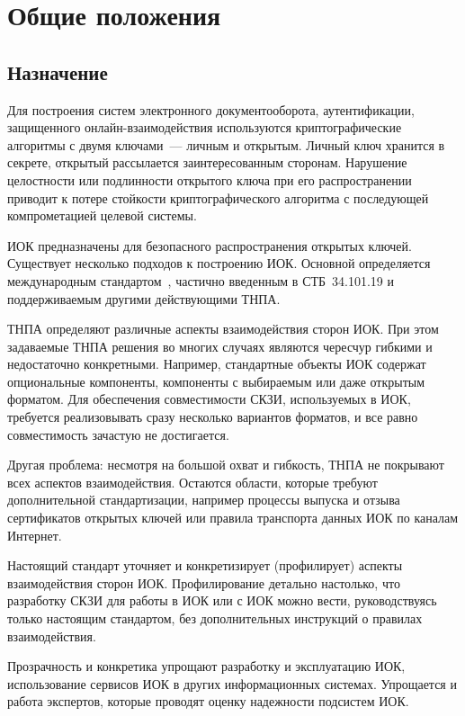\chapter{Общие положения}\label{COMMON}

\section{Назначение}

Для построения систем электронного документооборота, аутентификации, защищенного
онлайн-взаимодействия используются криптографические алгоритмы с двумя
ключами~--- личным и открытым. Личный ключ хранится в секрете, открытый
рассылается заинтересованным сторонам. Нарушение целостности или подлинности
открытого ключа при его распространении приводит к потере стойкости
криптографического алгоритма с последующей компрометацией целевой системы.

ИОК предназначены для безопасного распространения открытых ключей. Существует
несколько подходов к построению ИОК. Основной определяется международным
стандартом~\cite{X509}, частично введенным в СТБ~34.101.19 и поддерживаемым
другими действующими ТНПА.

ТНПА определяют различные аспекты взаимодействия сторон ИОК. При этом задаваемые
ТНПА решения во многих случаях являются чересчур гибкими и недостаточно
конкретными. Например, стандартные объекты ИОК содержат опциональные компоненты,
компоненты с выбираемым или даже открытым форматом. Для обеспечения
совместимости СКЗИ, используемых в ИОК, требуется реализовывать сразу несколько
вариантов форматов, и все равно совместимость зачастую не достигается.

Другая проблема: несмотря на большой охват и гибкость, ТНПА не покрывают всех
аспектов взаимодействия. Остаются области, которые требуют дополнительной
стандартизации, например процессы выпуска и отзыва сертификатов открытых ключей
или правила транспорта данных ИОК по каналам Интернет.

Настоящий стандарт уточняет и конкретизирует (профилирует) аспекты 
взаимодействия сторон ИОК. Профилирование детально настолько, что разработку 
СКЗИ для работы в ИОК или с ИОК можно вести, руководствуясь только настоящим 
стандартом, без дополнительных инструкций о правилах взаимодействия.

Прозрачность и конкретика упрощают разработку и эксплуатацию ИОК, использование
сервисов ИОК в других информационных системах. Упрощается и работа экспертов,
которые проводят оценку надежности подсистем ИОК.

